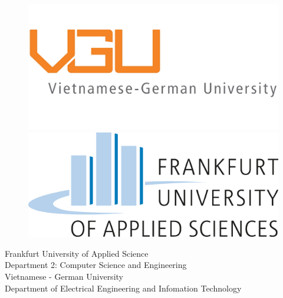 \pagestyle{empty}

\begin{titlepage}
		\begin{figure}
			\begin{minipage}[c]{0.4\linewidth}
			\includegraphics[scale=0.3]{VGU}
			\end{minipage}
			\hfil
				\begin{minipage}[c]{0.2\linewidth}
				\includegraphics[scale=0.25]{FRAUAS}
			\end{minipage}	
		\end{figure}
        \begin{center}
        \normalsize
        	Frankfurt University of Applied Science\\
        	Department 2: Computer Science and Engineering\\
        	\vspace*{0.1cm}
        	Vietnamese - German University\\
        	Department of Electrical Engineering and Infomation Technology
        

\end{center}
\end{titlepage}
